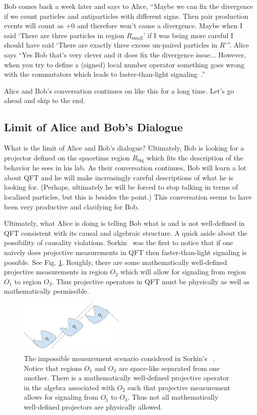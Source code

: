 \documentclass[prd,twocolumn,superscriptaddress,floatfix,amsmath,amssymb,amsfonts,nofootinbib]{revtex4-2}
\begin{document}
Bob comes back a week later and says to Alice, ``Maybe we can fix the divergence if we count particles and antiparticles with different signs. Then pair production events will count as +0 and therefore won't cause a divergence. Maybe when I said `There are three particles in region $R_\text{small}$' if I was being more careful I should have said `There are exactly three excess un-paired particles in $R$'''.  Alice says ``Yes Bob that's very clever and it does fix the divergence issue...  However, when you try to define a (signed) local number operator something goes wrong with the commutators which leads to faster-than-light signaling~\cite{Redhead1995}.''
 
Alice and Bob's conversation continues on like this for a long time. Let's go ahead and skip to the end.

\subsection{Limit of Alice and Bob's Dialogue}
What is the limit of Alice and Bob's dialogue? Ultimately, Bob is looking for a projector defined on the spacetime region $R_\text{big}$ which fits the description of the behavior he sees in his lab. As their conversation continues, Bob will learn a lot about QFT and he will make increasingly careful descriptions of what he is looking for. (Perhaps, ultimately he will be forced to stop talking in terms of localized particles, but this is besides the point.) This conversation seems to have been very productive and clarifying for Bob.

Ultimately, what Alice is doing is telling Bob what is and is not well-defined in QFT consistent with its causal and algebraic structure. A quick aside about the possibility of causality violations. Sorkin~\cite{Sorkin} was the first to notice that if one naively does projective measurements in QFT then faster-than-light signaling is possible. See Fig. \ref{FigSorkin}. Roughly, there are some mathematically well-defined projective measurements in region $O_2$ which will allow for signaling from region $O_1$ to region $O_3$. Thus projective operators in QFT must be physically as well as mathematically permissible.  
\begin{figure}
\includegraphics[width=0.45\textwidth]{Figures/SorkinDiagram.pdf}
\caption{The impossible measurement scenario considered in Sorkin's ~\cite{Sorkin}. Notice that regions $O_1$ and $O_3$ are space-like separated from one another. There is a mathematically well-defined projective operator in the algebra associated with $O_2$ such that projective measurement allows for signaling from $O_1$ to $O_3$. Thus not all mathematically well-defined projectors are physically allowed.}\label{FigSorkin}
\end{figure}
\end{document}
